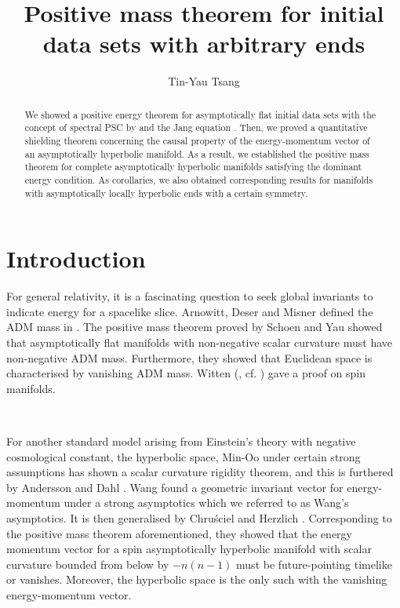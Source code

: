 \documentclass[11pt]{amsart}
\theoremstyle{remark}
\numberwithin{equation}{section}
\begin{document}
 
\title[AH PMT AF Shield with arbitrary ends]
{Positive mass theorem for initial data sets with arbitrary ends}

\author{Tin-Yau Tsang}
\address [Tin-Yau Tsang] {Department of Mathematics, University of British Columbia, Vancouver, BC, V6T 1Z2}

\begin{abstract}
We showed a positive energy theorem for asymptotically flat initial data sets with the concept of spectral PSC by \cite{HSY, BHHSZ, BW1} and the Jang equation \cite{SY2, E3,Jang}.  Then, we proved a quantitative shielding theorem concerning the causal property of the energy-momentum vector of an asymptotically hyperbolic manifold. As a result, we established the positive mass theorem for complete asymptotically hyperbolic manifolds satisfying the dominant energy condition. As corollaries, we also obtained corresponding results for manifolds with asymptotically locally hyperbolic ends with a certain symmetry.  
\end{abstract}

\maketitle

\section{Introduction}

For general relativity, it is a fascinating question to seek global invariants to  indicate energy for a spacelike slice. Arnowitt, Deser and Misner defined the ADM mass in \cite{ADM}. The positive mass theorem proved by Schoen and Yau \cite{SY1} showed that asymptotically flat manifolds with non-negative scalar curvature must have non-negative ADM mass. Furthermore, they showed that Euclidean space is characterised by vanishing ADM mass. Witten (\cite{W}, cf. \cite{PT}) gave a proof on spin manifolds. 

\

For another standard model arising from Einstein's theory with negative cosmological constant, the hyperbolic space, Min-Oo \cite{MO} under certain strong assumptions has shown a scalar curvature rigidity theorem, and this is furthered by Andersson and Dahl \cite{AD}. Wang found a geometric invariant vector for energy-momentum \cite{XW} under a strong asymptotics which we referred to as Wang's asymptotics. It is then generalised by Chruściel and Herzlich \cite{CH03}. Corresponding to the positive mass theorem aforementioned, they \cite{XW, CH03} showed that the energy momentum vector for a spin asymptotically hyperbolic manifold with scalar curvature bounded from below by $-n(n-1)$ must be future-pointing timelike or vanishes. Moreover, the hyperbolic space is the only such with the vanishing energy-momentum vector. 
\end{document}
